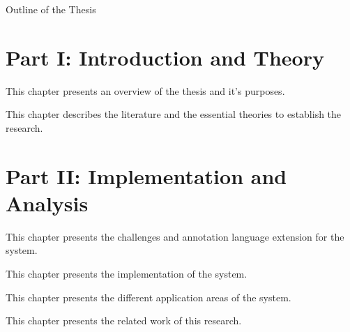 \clearemptydoublepage

{}

\begin{center}
	\huge{Outline of the Thesis}
\end{center}


\section*{Part I: Introduction and Theory}

  \vspace{1mm}

\noindent  This chapter presents an overview of the thesis and it's purposes. 

  \vspace{1mm}

\noindent  This chapter describes the literature and the essential theories to establish the research.

\section*{Part II: Implementation and Analysis}

  \vspace{1mm}

\noindent  This chapter presents the challenges and annotation language extension for the system.

  \vspace{1mm}

\noindent  This chapter presents the implementation of the system.

  \vspace{1mm}

\noindent  This chapter presents the different application areas of the system.

  \vspace{1mm}

\noindent  This chapter presents the related work of this research.

